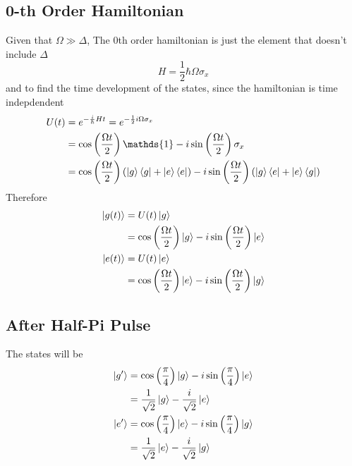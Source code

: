 \subsection{0-th Order Hamiltonian}
Given that $\Omega \gg \Delta$, The 0th order hamiltonian is just the element that doesn't include $\Delta$
\begin{equation}
	H = \frac{1}{2}\hbar\Omega\sigma_x
\end{equation}
and to find the time development of the states, since the hamiltonian is time indepdendent
\begin{align}
	U(t) &= e^{-\frac{i}{\hbar}Ht}=e^{-\frac{1}{2}i\Omega\sigma_x}\\
	&= \cos\ins{\frac{\Omega t}{2}}\mathds{1} -i\sin\ins{\frac{\Omega t}{2}}\sigma_x\\
	&= \cos\ins{\frac{\Omega t}{2}}\ins{\ketbra{g}{g}+\ketbra{e}{e}}-i\sin\ins{\frac{\Omega t}{2}}\ins{\ketbra{g}{e}+\ketbra{e}{g}}
\end{align}
Therefore 
\begin{align}
	\ket{g(t)}&=U(t)\ket{g}\\
	&=\cos\left(\frac{\Omega t}{2}\right)\ket{g}-i\sin\left(\frac{\Omega t}{2}\right)\ket{e}\\
	\ket{e(t)}&=U(t)\ket{e}\\
	&=\cos\left(\frac{\Omega t}{2}\right)\ket{e}-i\sin\left(\frac{\Omega t}{2}\right)\ket{g}
\end{align}

\newpage
\subsection{After Half-Pi Pulse}
The states will be
\begin{align}
	\ket{g'} &= \cos\left(\frac{\pi}{4}\right)\ket{g}-i\sin\left(\frac{\pi}{4}\right)\ket{e}\\
	&= \frac{1}{\sqrt{2}}\ket{g}-\frac{i}{\sqrt{2}}\ket{e}\\
	\ket{e'} &= \cos\left(\frac{\pi}{4}\right)\ket{e}-i\sin\left(\frac{\pi}{4}\right)\ket{g}\\
	&= \frac{1}{\sqrt{2}}\ket{e}-\frac{i}{\sqrt{2}}\ket{g}
\end{align}
